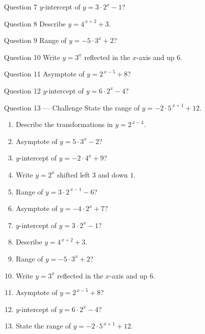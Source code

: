\documentclass[11pt]{article}
\begin{document}
\begin{qbox}{Question 7}
$y$-intercept of $y=3\cdot2^{x}-1$?\workspace{2.4cm}
\end{qbox}

\begin{qbox}{Question 8}
Describe $y=4^{\,x+2}+3$.\workspace{2.4cm}
\end{qbox}

\begin{qbox}{Question 9}
Range of $y=-5\cdot3^{x}+2$?\workspace{2.4cm}
\end{qbox}

\begin{qbox}{Question 10}
Write $y=3^{x}$ reflected in the $x$-axis and up $6$.\workspace{2.4cm}
\end{qbox}

\begin{qbox}{Question 11}
Asymptote of $y=2^{\,x-5}+8$?\workspace{2.4cm}
\end{qbox}

\begin{qbox}{Question 12}
$y$-intercept of $y=6\cdot2^{x}-4$?\workspace{2.4cm}
\end{qbox}

\begin{qbox}{Question 13 --- Challenge}
State the range of $y=-2\cdot5^{\,x+1}+12$.\workspace{3cm}
\end{qbox}

\clearpage
{}

\begin{recapbox}
\begin{multicols}{2}
\small
\begin{enumerate}[leftmargin=*,itemsep=3pt]
  \item Describe the transformations in $y=2^{\,x-4}$.
  \item Asymptote of $y=5\cdot3^{x}-2$?
  \item $y$-intercept of $y=-2\cdot4^{x}+9$?
  \item Write $y=2^{x}$ shifted left $3$ and down $1$.
  \item Range of $y=3\cdot2^{\,x-1}-6$?
  \item Asymptote of $y=-4\cdot2^{x}+7$?
  \item $y$-intercept of $y=3\cdot2^{x}-1$?
  \item Describe $y=4^{\,x+2}+3$.
  \item Range of $y=-5\cdot3^{x}+2$?
  \item Write $y=3^{x}$ reflected in the $x$-axis and up $6$.
  \item Asymptote of $y=2^{\,x-5}+8$?
  \item $y$-intercept of $y=6\cdot2^{x}-4$?
  \item State the range of $y=-2\cdot5^{\,x+1}+12$.
\end{enumerate}
\end{multicols}
\end{recapbox}
\end{document}

